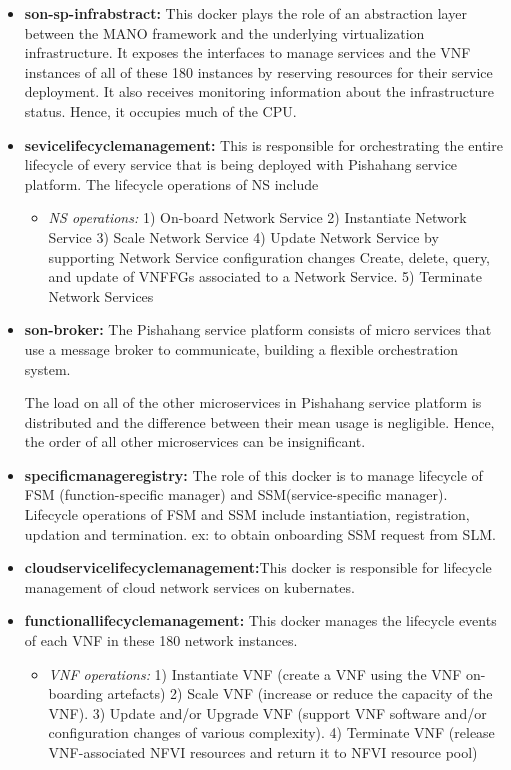 \begin{itemize}
	\item \textbf{son-sp-infrabstract:} This docker plays the role of an abstraction layer between the MANO framework and the underlying virtualization infrastructure. It exposes the interfaces to manage services and the VNF instances of all of these 180 instances by reserving resources for their service deployment. It also receives monitoring information about the infrastructure status. Hence, it occupies much of the CPU.
	\item \textbf{sevicelifecyclemanagement:} This is responsible for orchestrating the entire lifecycle of every service that is being deployed with Pishahang service platform. The lifecycle operations of NS include
	
	\begin{itemize}
		\item \textit{NS operations:} 
		1) On-board Network Service
		2) Instantiate Network Service
		3) Scale Network Service
		4) Update Network Service by supporting Network Service configuration changes
		Create, delete, query, and update of VNFFGs associated to a Network Service.
		5) Terminate Network Services
		
	\end{itemize}

	\item \textbf{son-broker:} The Pishahang service platform consists of micro services that use a message broker to communicate, building a flexible orchestration system.
	
The load on all of the other microservices in Pishahang service platform is distributed and the difference between their mean usage is negligible. Hence, the order of all other microservices can be insignificant.

	
	\item \textbf{specificmanageregistry:} The role of this docker is to manage lifecycle of FSM (function-specific manager) and SSM(service-specific manager). Lifecycle operations of FSM and SSM include instantiation, registration, updation and termination. ex: to obtain onboarding SSM request from SLM.
	\item \textbf{cloudservicelifecyclemanagement:}This docker is responsible for lifecycle management of cloud network services on kubernates.
	\item \textbf{functionallifecyclemanagement:}  This docker manages the lifecycle events of each VNF in these 180 network instances. 

\begin{itemize}
		
	\item \textit{VNF operations:} 1) Instantiate VNF (create a VNF using the VNF on-boarding artefacts)
	2) Scale VNF (increase or reduce the capacity of the VNF).
	3) Update and/or Upgrade VNF (support VNF software and/or configuration changes of various complexity).
	4) Terminate VNF (release VNF-associated NFVI resources and return it to NFVI resource pool)
\end{itemize}
	\end{itemize}

